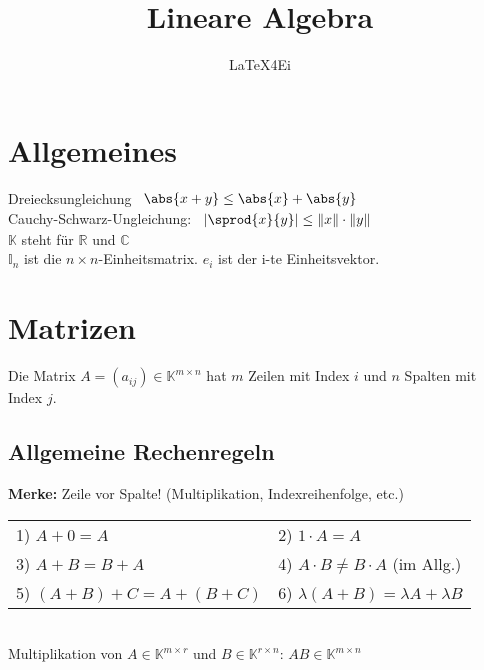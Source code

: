 \documentclass[german, 6pt]{latex4ei/latex4ei_sheet}
\title{Lineare Algebra}
\author{LaTeX4Ei}
\begin{document}
\ifdefined\GitRevision{}\fi
\ifdefined\GitIssuesURL
  \ifdefined\setissueslinkurl
    \setissueslinkurl{\GitIssuesURL} %
  \fi
\fi

\maketitle
\section{Allgemeines} %
\label{sub:allgemeines}

Dreiecksungleichung \qquad \qquad \qquad
\begin{math}\begin{array}{l}
	\abs{x + y} \le \abs{x} + \abs{y}
\end{array}\end{math} \\
Cauchy-Schwarz-Ungleichung: \qquad 
\begin{math}\begin{array}{l}
\left| \sprod{x}{y} \right| \le \| x\| \cdot \| y\|
\end{array}\end{math}\\
$\mathbb{K}$ steht für $\mathbb{R}$ und $\mathbb{C}$\\
$\mathbb{I}_n$ ist die $n\times n$-Einheitsmatrix. \qquad$e_i$ ist der i-te Einheitsvektor.
\section{Matrizen}
Die Matrix $A=(a_{ij}) \in \mathbb K^{m\times n}$ hat $m$ Zeilen mit Index $i$ und $n$ Spalten mit Index $j$.

\subsection{Allgemeine Rechenregeln}
\textbf{Merke:} Zeile vor Spalte! (Multiplikation, Indexreihenfolge, etc.)
\begin{tabular}{ll}	
	1)  $A+0=A$ & 2)  $1 \cdot A=A$ \\
	3)  $A+B=B+A$ & 4) $A \cdot B \ne B \cdot A$ (im Allg.) \\
	5)  $(A+B)+C=A+(B+C)$ & 6) $\lambda (A+B) = \lambda A + \lambda B$\\ 
\end{tabular}\\
Multiplikation von $A\in \mathbb K^{m\times r}$ und $B\in \mathbb K^{r\times n}$: $AB\in\mathbb K^{m\times n}$
\end{document}
